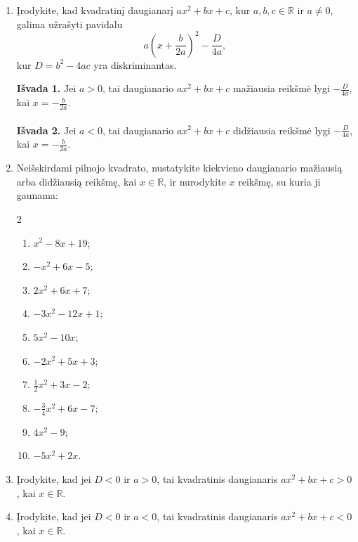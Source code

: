 \documentclass[11pt,a4paper]{article}
\begin{document}
\begin{enumerate}[start=3]
\item \begin{minipage}[t]{\linewidth}Įrodykite, kad kvadratinį daugianarį $ax^2+bx+c$, kur $a,b,c\in\mathbb{R}$ ir $a\ne0$, galima užrašyti pavidalu
\[
a\left(x+\frac{b}{2a}\right)^2-\frac{D}{4a},
\]
kur $D=b^2-4ac$ yra diskriminantas.\end{minipage}

\textbf{Išvada 1.} Jei $a>0$, tai daugianario $ax^2+bx+c$ mažiausia reikšmė lygi $-\frac{D}{4a}$, kai $x=-\frac{b}{2a}$.\\ \\
\textbf{Išvada 2.} Jei $a<0$, tai daugianario $ax^2+bx+c$ didžiausia reikšmė lygi $-\frac{D}{4a}$, kai $x=-\frac{b}{2a}$.

\item Neišskirdami pilnojo kvadrato, nustatykite kiekvieno daugianario mažiausią arba didžiausią reikšmę, kai $x\in\mathbb{R}$, ir nurodykite $x$ reikšmę, su kuria ji gaunama:
\begin{multicols}{2}
\begin{enumerate}[label=(\alph*),leftmargin=1cm,itemsep=0.35em,topsep=0pt]
\item $x^2-8x+19$;
\item $-x^2+6x-5$;
\item $2x^2+6x+7$;
\item $-3x^2-12x+1$;
\item $5x^2-10x$;
\item $-2x^2+5x+3$;
\item $\frac12x^2+3x-2$;
\item $-\frac34x^2+6x-7$;
\item $4x^2-9$;
\item $-5x^2+2x$.
\end{enumerate}
\end{multicols}

\item \begin{minipage}[t]{\linewidth}Įrodykite, kad jei $D<0$ ir $a>0$, tai kvadratinis daugianaris $ax^2+bx+c >0$, kai $x \in \mathbb{R}$.\end{minipage}
\item \begin{minipage}[t]{\linewidth}Įrodykite, kad jei $D<0$ ir $a<0$, tai kvadratinis daugianaris $ax^2+bx+c <0$, kai $x \in \mathbb{R}$.\end{minipage}


\end{enumerate}
\end{document}
